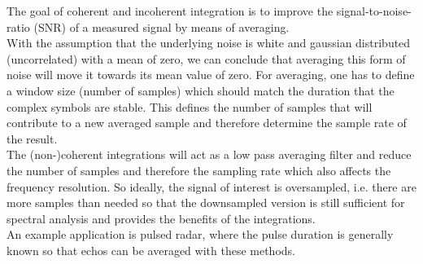 The goal of coherent and incoherent integration is to improve the signal-to-noise-ratio (SNR) of a measured signal by means of averaging. \cite{hysell_radar}\cite{yt_tut}\\

With the assumption that the underlying noise is white and gaussian distributed (uncorrelated) with a mean of zero, we can conclude that averaging this form of noise will move it towards its mean value of zero. For averaging, one has to define a window size (number of samples) which should match the duration that the complex symbols are stable. This defines the number of samples that will contribute to a new averaged sample and therefore determine the sample rate of the result.\\

The (non-)coherent integrations will act as a low pass averaging filter and reduce the number of samples and therefore the sampling rate which also affects the frequency resolution. So ideally, the signal of interest is oversampled, i.e. there are more samples than needed so that the downsampled version is still sufficient for spectral analysis and provides the benefits of the integrations.\\

An example application is pulsed radar, where the pulse duration is generally known so that echos can be averaged with these methods.

